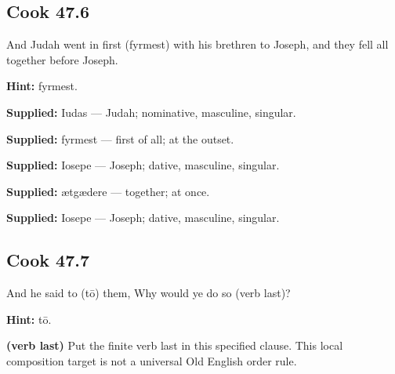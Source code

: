 \par\begin{minipage}{\linewidth}\raggedright
\subsection*{Cook 47.6}

And Judah went in first (fyrmest) with his brethren to Joseph, and they fell all together before Joseph.

\textbf{Hint:} fyrmest.

\textbf{Supplied:} Iudas — Judah; nominative, masculine, singular.

\end{minipage}\par\addvspace{4pt}

\textbf{Supplied:} fyrmest — first of all; at the outset.

\textbf{Supplied:} Iosepe — Joseph; dative, masculine, singular.

\textbf{Supplied:} ætgædere — together; at once.

\textbf{Supplied:} Iosepe — Joseph; dative, masculine, singular.

\par\begin{minipage}{\linewidth}\raggedright
\subsection*{Cook 47.7}

And he said to (tō) them, Why would ye do so (verb last)?

\textbf{Hint:} tō.

\textbf{(verb last)} Put the finite verb last in this specified clause. This local composition target is not a universal Old English order rule.

\end{minipage}\par\addvspace{4pt}

